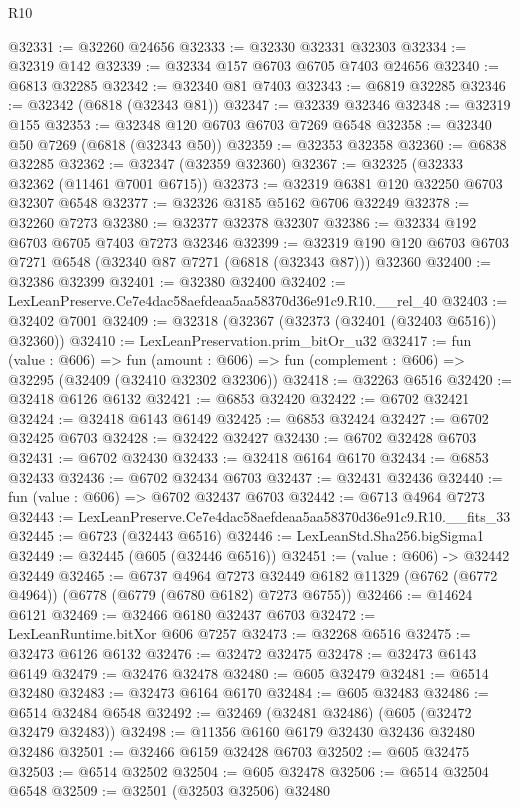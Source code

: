 \begin{lexlean}{R10}
\begin{coremodule}
@32331 := @32260 @24656
@32333 := @32330 @32331 @32303
@32334 := @32319 @142
@32339 := @32334 @157 @6703 @6705 @7403 @24656
@32340 := @6813 @32285
@32342 := @32340 @81 @7403
@32343 := @6819 @32285
@32346 := @32342 (@6818 (@32343 @81))
@32347 := @32339 @32346
@32348 := @32319 @155
@32353 := @32348 @120 @6703 @6703 @7269 @6548
@32358 := @32340 @50 @7269 (@6818 (@32343 @50))
@32359 := @32353 @32358
@32360 := @6838 @32285
@32362 := @32347 (@32359 @32360)
@32367 := @32325 (@32333 @32362 (@11461 @7001 @6715))
@32373 := @32319 @6381 @120 @32250 @6703 @32307 @6548
@32377 := @32326 @3185 @5162 @6706 @32249
@32378 := @32260 @7273
@32380 := @32377 @32378 @32307
@32386 := @32334 @192 @6703 @6705 @7403 @7273 @32346
@32399 := @32319 @190 @120 @6703 @6703 @7271 @6548 (@32340 @87 @7271 (@6818 (@32343 @87))) @32360
@32400 := @32386 @32399
@32401 := @32380 @32400
@32402 := LexLeanPreserve.Ce7e4dac58aefdeaa5aa58370d36e91c9.R10.__rel_40
@32403 := @32402 @7001
@32409 := @32318 (@32367 (@32373 (@32401 (@32403 @6516)) @32360))
@32410 := LexLeanPreservation.prim_bitOr_u32
@32417 := fun (value : @606) =>
  fun (amount : @606) => fun (complement : @606) => @32295 (@32409 (@32410 @32302 @32306))
@32418 := @32263 @6516
@32420 := @32418 @6126 @6132
@32421 := @6853 @32420
@32422 := @6702 @32421
@32424 := @32418 @6143 @6149
@32425 := @6853 @32424
@32427 := @6702 @32425 @6703
@32428 := @32422 @32427
@32430 := @6702 @32428 @6703
@32431 := @6702 @32430
@32433 := @32418 @6164 @6170
@32434 := @6853 @32433
@32436 := @6702 @32434 @6703
@32437 := @32431 @32436
@32440 := fun (value : @606) => @6702 @32437 @6703
@32442 := @6713 @4964 @7273
@32443 := LexLeanPreserve.Ce7e4dac58aefdeaa5aa58370d36e91c9.R10.__fits_33
@32445 := @6723 (@32443 @6516)
@32446 := LexLeanStd.Sha256.bigSigma1
@32449 := @32445 (@605 (@32446 @6516))
@32451 := (value : @606) -> @32442 @32449
@32465 := @6737
    @4964
    @7273
    @32449
    @6182
    @11329
    (@6762 (@6772 @4964))
    (@6778 (@6779 (@6780 @6182) @7273 @6755))
@32466 := @14624 @6121
@32469 := @32466 @6180 @32437 @6703
@32472 := LexLeanRuntime.bitXor @606 @7257
@32473 := @32268 @6516
@32475 := @32473 @6126 @6132
@32476 := @32472 @32475
@32478 := @32473 @6143 @6149
@32479 := @32476 @32478
@32480 := @605 @32479
@32481 := @6514 @32480
@32483 := @32473 @6164 @6170
@32484 := @605 @32483
@32486 := @6514 @32484 @6548
@32492 := @32469 (@32481 @32486) (@605 (@32472 @32479 @32483))
@32498 := @11356 @6160 @6179 @32430 @32436 @32480 @32486
@32501 := @32466 @6159 @32428 @6703
@32502 := @605 @32475
@32503 := @6514 @32502
@32504 := @605 @32478
@32506 := @6514 @32504 @6548
@32509 := @32501 (@32503 @32506) @32480

\end{coremodule}
\end{lexlean}

